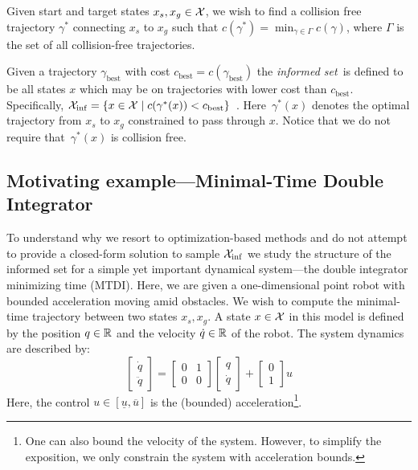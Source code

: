 \documentclass[letterpaper, 10 pt, conference]{ieeeconf}  %
\begin{document}
Given start and target states $x_s, x_g \in \mathcal{X}$, we wish to find a collision free trajectory $\gamma^*$ connecting $x_s$ to $x_g$ such that 
$c(\gamma^*) = \min_{\gamma \in \Gamma} c(\gamma)$, where $\Gamma$ is the set of all collision-free trajectories.

Given a trajectory $\gamma_{\text{best}}$ with cost $c_{\text{best}} = c(\gamma_{\text{best}})$ the \emph{informed set}~\Cinf is defined to be all states $x$  which may be on trajectories with lower cost than $c_{\text{best}}$.
Specifically,
$
\mathcal{X}_{\rm {inf}} = \{ x \in \mathcal{X} \mid  
		c ( \gamma^*(x) ) < c_{\rm best} \} $~\cite{GSB14}.
Here~$ \gamma^*(x) $ denotes the optimal trajectory  from $ x_s $ to $ x_g $ constrained to pass through $ x $.
Notice that we do not require that~$ \gamma^*(x) $ is collision free.



\subsection{Motivating example---Minimal-Time Double Integrator}
\label{sec:mtdi}


To understand why we resort to optimization-based methods and do not attempt to provide a closed-form solution to sample $\mathcal{X}_{\rm {inf}}$ we study the structure of the informed set for a simple yet important dynamical system---the double integrator minimizing time (MTDI). 
Here, we are given a one-dimensional point robot with bounded acceleration moving amid obstacles. We wish to compute the minimal-time trajectory between two states $x_s, x_g$.
A state $x \in \mathcal{X}$ in this model is defined by 
the position $q \in \mathbb{R}$
and
the velocity $\dot{q}\in \mathbb{R}$ of the robot.
The system dynamics are described by:
\begin{equation}
\begin{bmatrix}
	\dot{q} \\
	\ddot{q}
\end{bmatrix}
=
\begin{bmatrix}
	0 & 1 \\
	0 & 0
\end{bmatrix}
\begin{bmatrix}
	{q} \\
	\dot{q}
\end{bmatrix}
+
\begin{bmatrix}
	0 \\
	1
\end{bmatrix}
u
\end{equation}
Here, the control 
$u \in [\underline{u}, \overline{u}]$ 
is the (bounded) acceleration\footnote{One can also bound the velocity of the system. However, to simplify the exposition, we only constrain the system with acceleration bounds.}. 
\end{document}
